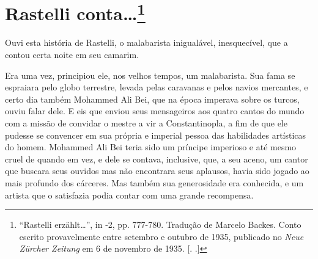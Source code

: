 \chapter{Rastelli conta\ldots{}\footnote[*]{``Rastelli erzählt\ldots{}'', in  -2, pp.
  777-780. Tradução de Marcelo Backes. Conto escrito provavelmente entre
  setembro e outubro de 1935, publicado no \emph{Neue Zürcher Zeitung}
  em 6 de novembro de 1935. [. .]} }
Ouvi esta história de Rastelli, o malabarista inigualável, inesquecível,
que a contou certa noite em seu camarim.

Era uma vez, principiou ele, nos velhos tempos, um malabarista. Sua fama
se espraiara pelo globo terrestre, levada pelas caravanas e pelos navios
mercantes, e certo dia também Mohammed Ali Bei, que na época imperava
sobre os turcos, ouviu falar dele. E eis que enviou seus mensageiros aos
quatro cantos do mundo com a missão de convidar o mestre a vir a
Constantinopla, a fim de que ele pudesse se convencer em sua própria e
imperial pessoa das habilidades artísticas do homem. Mohammed Ali Bei
teria sido um príncipe imperioso e até mesmo cruel de quando em vez, e
dele se contava, inclusive, que, a seu aceno, um cantor que buscara seus
ouvidos mas não encontrara seus aplausos, havia sido jogado ao mais
profundo dos cárceres. Mas também sua generosidade era conhecida, e um
artista que o satisfazia podia contar com uma grande recompensa.

